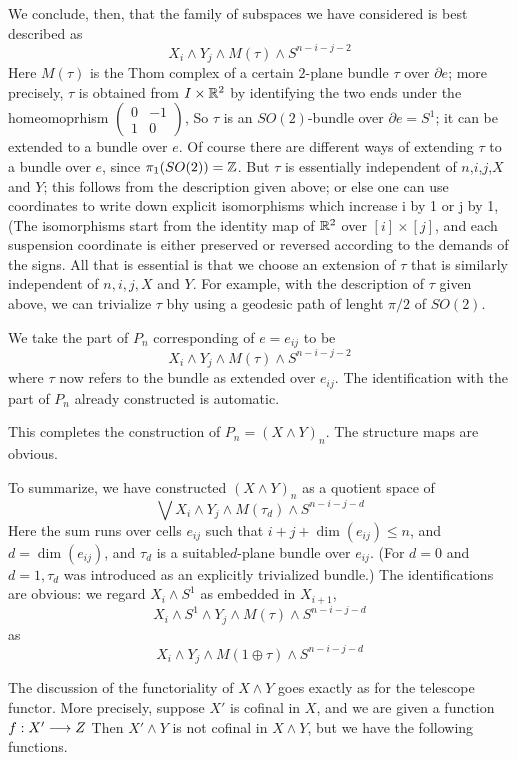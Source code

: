 \documentclass[../main]{subfiles}
\begin{document}
We conclude, then, that the family of subspaces we have considered is best described as $$X_i\wedge Y_j\wedge M(\tau) \wedge S^{n-i-j-2} $$
Here $M(\tau)$ is the Thom complex of a certain $2$-plane bundle $\tau$ over $\partial e$; more precisely, $\tau$ is obtained from $I\times \mathbb{R}^2$ by identifying the two ends under the homeomoprhism $\begin{pmatrix}0&-1\\ 1&0 \end{pmatrix}$, So $\tau$ is an $SO(2)$-bundle over $\partial e=S^1$; it can be extended to a bundle over $e$. Of course there are different ways of extending $\tau$ to a bundle over $e$, since $\pi_1(SO(2))=\mathbb{Z}$. But $\tau$ is essentially independent of $n$,$i$,$j$,$X$ and $Y$;
this follows from the description given above; or else one can use
coordinates to write down explicit isomorphisms which increase i by 1
 or j by 1, (The isomorphisms start from the identity map of $\mathbb{R}^2$ over $[i]\times [j]$, and each suspension coordinate is either preserved or reversed
according to the demands of the signs. All that is essential is that we
choose an extension of $\tau$ that is similarly independent of $n,i,j,X$ and $Y$. For example, with the description of $\tau$ given above, we can trivialize $\tau$ bhy using a geodesic path of lenght $\pi/2$ of $SO(2)$.

We take the part of $P_n$ corresponding of $e=e_{ij}$ to be $$X_i\wedge Y_j \wedge M(\tau) \wedge S^{n-i-j-2}$$
where $\tau$ now refers to the bundle as extended over $e_{ij}$. The identification with the part of $P_n$ already constructed is automatic. 

This completes the construction of $P_n=(X\wedge Y)_n$. The structure maps are obvious.

To summarize, we have constructed $(X\wedge Y)_n$ as a quotient space of $$\bigvee X_i\wedge Y_j \wedge M(\tau_d)\wedge S^{n-i-j-d}$$
Here the sum runs over cells $e_{ij}$ such that $i+j+\dim(e_{ij})\leq n$, and $d=\dim(e_{ij})$, and $\tau_d$ is a suitable$d$-plane bundle over $e_{ij}$. (For $d=0$ and $d=1,\tau_d$ was introduced as an explicitly trivialized bundle.) The identifications are obvious: we regard $X_i\wedge S^1$ as embedded in $X_{i+1}$,
$$X_i\wedge S^1 \wedge Y_j \wedge M(\tau) \wedge S^{n-i-j-d} $$
as
$$X_i\wedge Y_j\wedge M(1\oplus \tau) \wedge S^{n-i-j-d} $$

The discussion of the functoriality of $X\wedge Y$ goes exactly as for the telescope functor. More precisely, suppose $X'$ is cofinal in $X$, and we are given a function $f:X'\overset{}{\longrightarrow}Z$ Then $X'\wedge Y$ is not cofinal in $X\wedge Y$, but we have the following functions.
\end{document}
